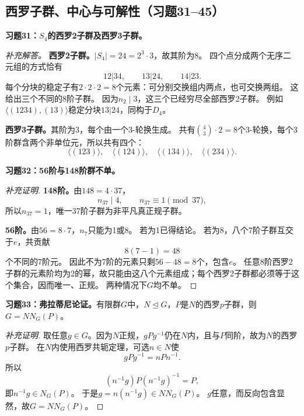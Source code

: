 \subsection*{西罗子群、中心与可解性（习题31--45）}

\begin{problem}
\textbf{习题31：$S_4$的西罗2子群及西罗3子群。}
\end{problem}
\begin{solution}
\textit{补充解答。}
\textbf{西罗2子群。}$|S_4|=24=2^3\cdot3$，故其阶为8。
四个点分成两个无序二元组的方式恰有
\[
12|34,\qquad13|24,\qquad14|23.
\]
每个分块的稳定子有$2\cdot2\cdot2=8$个元素：可分别交换组内两点，也可交换两组。
这给出三个不同的8阶子群。
因为$n_2\mid3$，这三个已经穷尽全部西罗2子群。
例如$\langle(1234),(13)\rangle$稳定分块$13|24$，同构于$D_4$。

\textbf{西罗3子群。}其阶为3，每个由一个3-轮换生成。
共有$\binom43\cdot2=8$个3-轮换，每个3阶群含两个非单位元，所以共有四个：
\[
\langle(123)\rangle,\quad\langle(124)\rangle,
\quad\langle(134)\rangle,\quad\langle(234)\rangle.
\]
\end{solution}

\begin{problem}
\textbf{习题32：56阶与148阶群不单。}
\end{problem}
\begin{proof}[补充证明]
\textbf{148阶。}由$148=4\cdot37$，
\[
n_{37}\mid4,\qquad n_{37}\equiv1\pmod{37},
\]
所以$n_{37}=1$，唯一37阶子群为非平凡真正规子群。

\textbf{56阶。}由$56=8\cdot7$，$n_7$只能为1或8。
若为1已得结论。
若为8，八个7阶子群互交于$e$，共贡献
\[
8(7-1)=48
\]
个不同的7阶元。
因此不为7阶的元素只剩$56-48=8$个，包含$e$。
任意8阶西罗2子群的元素阶均为2的幂，故只能由这八个元素组成；每个西罗2子群都必须等于这个集合，因而唯一、正规。
两种情况下$G$均不单。
\end{proof}

\begin{problem}
\textbf{习题33：弗拉蒂尼论证。}有限群$G$中，$N\trianglelefteq G$，$P$是$N$的西罗$p$子群，则$G=N N_G(P)$。
\end{problem}
\begin{proof}[补充证明]
取任意$g\in G$。因为$N$正规，$gPg^{-1}$仍在$N$内，且与$P$同阶，故为$N$的西罗$p$子群。
在$N$内使用西罗共轭定理，可选$n\in N$使
\[
gPg^{-1}=nPn^{-1}.
\]
所以
\[
(n^{-1}g)P(n^{-1}g)^{-1}=P,
\]
即$n^{-1}g\in N_G(P)$。
于是$g=n(n^{-1}g)\in N N_G(P)$。
$g$任意，而反向包含显然，故$G=N N_G(P)$。
\end{proof}

